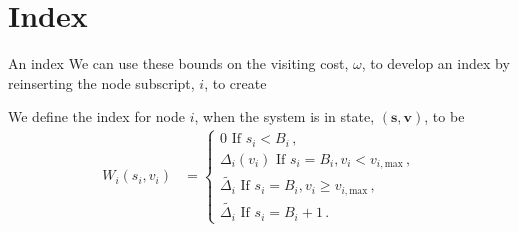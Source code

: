 \documentclass[10pt]{beamer}
\begin{document}
\section{Index}
\begin{frame}{An index}
We can use these bounds on the visiting cost, $\omega$, to develop an index by reinserting the node subscript, $i$, to create


\begin{definition}
We define the index for node $i$, when the system is in state, $(\bm{s},\bm{v})$, to be
\begin{align*}
W_{i}(s_{i},v_{i})&=\begin{cases}
0 \text{ If } s_{i}<B_{i} \, , \\
\Delta_{i}(v_{i}) \text{ If } s_{i}=B_{i} , v_{i}<v_{i,\text{max}} \, , \\
\widetilde{\Delta_{i}} \text{ If } s_{i}=B_{i} , v_{i} \geq v_{i,\text{max}} \, , \\
\widetilde{\Delta_{i}} \text{ If } s_{i}=B_{i}+1 \, .
\end{cases}
\end{align*}
\end{definition}
\end{frame}
\end{document}
